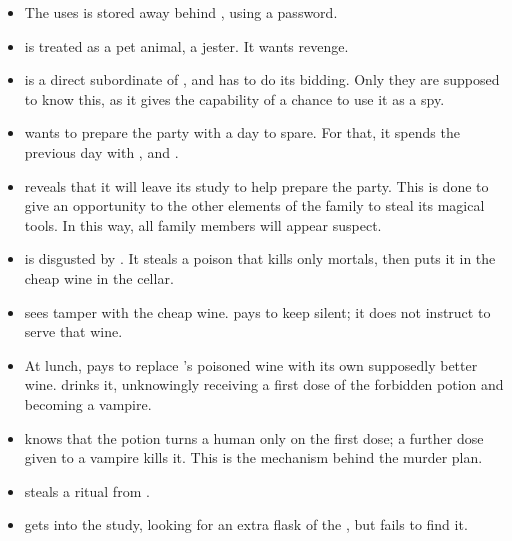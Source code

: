 \begin{itemize}
  \item The   uses is stored away behind , using a password.
  
  \item {} is treated as a pet animal, a jester. It wants revenge.
  
  \item {} is a direct subordinate of , and has to do its bidding. Only they are supposed to know this, as it gives the capability of  a chance to use it as a spy.
  
  \item {} wants to prepare the party with a day to spare. For that, it spends the previous day with ,  and .
  
  \item {} reveals that it will leave its study to help  prepare the party. This is done to give an opportunity to the other elements of the family to steal its magical tools. In this way, all family members will appear suspect.
  
  \item {} is disgusted by . It steals a poison that kills only mortals, then puts it in the cheap wine in the cellar.
  
  \item {} sees  tamper with the cheap wine.  pays  to keep silent; it does not instruct  to serve that wine.
  
  \item At lunch,  pays  to replace 's poisoned wine with its own supposedly better wine.  drinks it, unknowingly receiving a first dose of the forbidden potion and becoming a vampire.

  \item {} knows that the potion turns a human only on the first dose; a further dose given to a vampire kills it. This is the mechanism behind the murder plan.
  
  \item {} steals a ritual from .
  
  \item {} gets into the study, looking for an extra flask of the , but fails to find it.
  

\end{itemize}
